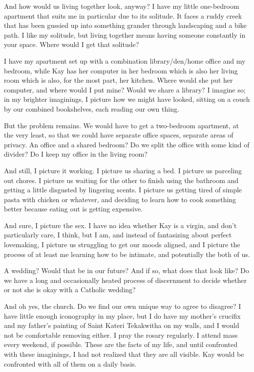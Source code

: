 And how would us living together look, anyway? I have my little one-bedroom apartment that suits me in particular due to its solitude. It faces a ruddy creek that has been gussied up into something grander through landscaping and a bike path. I like my solitude, but living together means having someone constantly in your space. Where would I get that solitude?

I have my apartment set up with a combination library/den/home office and my bedroom, while Kay has her computer in her bedroom which is also her living room which is also, for the most part, her kitchen. Where would she put her computer, and where would I put mine? Would we share a library? I imagine so; in my brighter imaginings, I picture how we might have looked, sitting on a couch by our combined bookshelves, each reading our own thing.

But the problem remains. We would have to get a two-bedroom apartment, at the very least, so that we could have separate office spaces, separate areas of privacy. An office and a shared bedroom? Do we split the office with some kind of divider? Do I keep my office in the living room?

And still, I picture it working. I picture us sharing a bed. I picture us parceling out chores. I picture us waiting for the other to finish using the bathroom and getting a little disgusted by lingering scents. I picture us getting tired of simple pasta with chicken or whatever, and deciding to learn how to cook something better because eating out is getting expensive.

And sure, I picture the sex. I have no idea whether Kay is a virgin, and don't particularly care, I think, but I am, and instead of fantasizing about perfect lovemaking, I picture us struggling to get our moods aligned, and I picture the process of at least me learning how to be intimate, and potentially the both of us.

A wedding? Would that be in our future? And if so, what does that look like? Do we have a long and occasionally heated process of discernment to decide whether or not she is okay with a Catholic wedding?

And oh yes, the church. Do we find our own unique way to agree to disagree? I have little enough iconography in my place, but I do have my mother's crucifix and my father's painting of Saint Kateri Tekakwitha on my walls, and I would not be comfortable removing either. I pray the rosary regularly. I attend mass every weekend, if possible. These are the facts of my life, and until confronted with these imaginings, I had not realized that they are all visible. Kay would be confronted with all of them on a daily basis.

